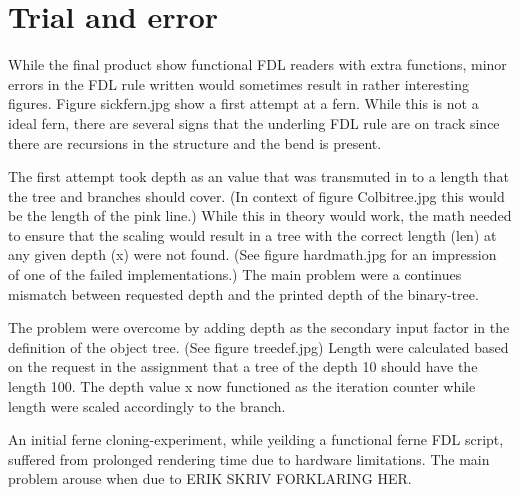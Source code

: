 \documentclass[titlepage]{article}
\begin{document}
\section{Trial and error}
While the final product show functional FDL readers with extra functions, minor errors in the FDL rule written would sometimes result in rather interesting figures. Figure sickfern.jpg  show a first attempt at a fern. While this is not a ideal fern, there are several signs that the underling FDL rule are on track since there are recursions in the structure and the bend is present. \par
The first attempt took depth as an value that was transmuted in to a length that the tree and branches should cover. (In context of figure Colbitree.jpg  this would be the length of the pink line.) 
While this in theory would work, the math needed to ensure that the scaling would result in a tree with the correct length (len) at any given depth (x) were not found. (See figure hardmath.jpg  for an impression of one of the failed implementations.) The main problem were a continues mismatch between requested depth and the printed depth of the binary-tree. \par
The problem were overcome by adding depth as the secondary input factor in the definition of the object tree. (See figure treedef.jpg)  Length were calculated based on the request in the assignment that a tree of the depth 10 should have the length 100. The depth value x now functioned as the iteration counter while length were scaled accordingly to the branch.\par  
An initial ferne cloning-experiment, while yeilding a functional ferne FDL script, suffered from prolonged rendering time due to hardware limitations. The main problem arouse when due to ERIK SKRIV FORKLARING HER.
\end{document}
